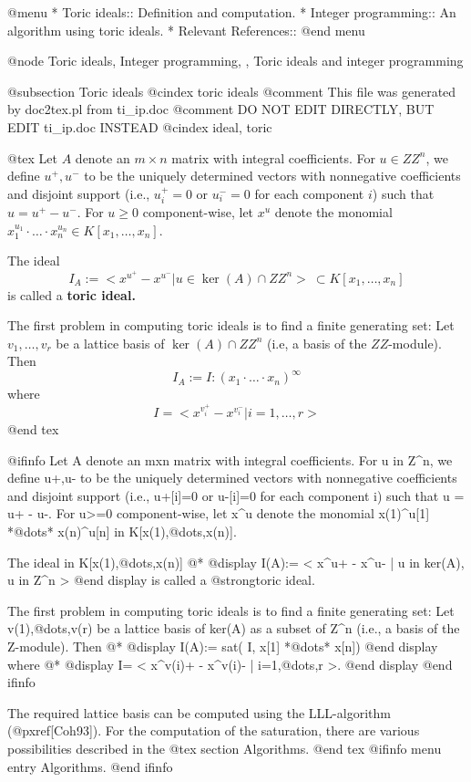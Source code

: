 @menu
* Toric ideals::                Definition and computation.
* Integer programming::         An algorithm using toric ideals.
* Relevant References::
@end menu

@node Toric ideals, Integer programming, , Toric ideals and integer programming

@subsection Toric ideals
@cindex toric ideals
@comment This file was generated by doc2tex.pl from ti_ip.doc
@comment DO NOT EDIT DIRECTLY, BUT EDIT ti_ip.doc INSTEAD
@cindex ideal, toric

@tex
Let $A$ denote an $m\times n$ matrix with integral coefficients. For $u
\in Z\!\!\! Z^n$, we define $u^+,u^-$ to be the uniquely determined
vectors with nonnegative coefficients and disjoint support (i.e.,
$u_i^+=0$ or $u_i^-=0$ for each component $i$) such that
$u=u^+-u^-$. For $u\geq 0$ component-wise, let $x^u$ denote the monomial
$x_1^{u_1}\cdot\ldots\cdot x_n^{u_n}\in K[x_1,\ldots,x_n]$.

The ideal
$$ I_A:=<x^{u^+}-x^{u^-} | u\in\ker(A)\cap Z\!\!\! Z^n>\ \subset
K[x_1,\ldots,x_n] $$
is called a \bf toric ideal. \rm

The first problem in computing toric ideals is to find a finite
generating set: Let $v_1,\ldots,v_r$ be a lattice basis of $\ker(A)\cap
Z\!\!\! Z^n$ (i.e, a basis of the $Z\!\!\! Z$-module). Then
$$ I_A:=I:(x_1\cdot\ldots\cdot x_n)^\infty $$
where
$$ I=<x^{v_i^+}-x^{v_i^-}|i=1,\ldots,r> $$
@end tex

@ifinfo
Let A denote an mxn matrix with integral coefficients. For u in
Z^n, we define u+,u- to be the uniquely determined vectors with
nonnegative coefficients and disjoint support (i.e., u+[i]=0 or u-[i]=0
for each component i) such that u = u+ - u-.
For u>=0 component-wise, let x^u
denote the monomial x(1)^u[1] *@dots{}* x(n)^u[n] in K[x(1),@dots{},x(n)].

The ideal in K[x(1),@dots{},x(n)] @*
@display
I(A):= < x^u+ - x^u- | u in ker(A), u in Z^n >
@end display
is called a @strong{toric ideal}.

The first problem in computing toric ideals is to find a finite
generating set: Let v(1),@dots{},v(r) be a lattice basis of ker(A) as a
subset of Z^n (i.e., a basis of the Z-module). Then @*
@display
I(A):= sat( I, x[1] *@dots{}* x[n])
@end display
where @*
@display
I= < x^v(i)+ - x^v(i)- | i=1,@dots{},r >.
@end display
@end ifinfo

The required lattice basis can be computed using the LLL-algorithm (@pxref{[Coh93]}). For the computation of the saturation, there are various
possibilities described in the
@tex
section Algorithms.
@end tex
@ifinfo
menu entry Algorithms.
@end ifinfo

